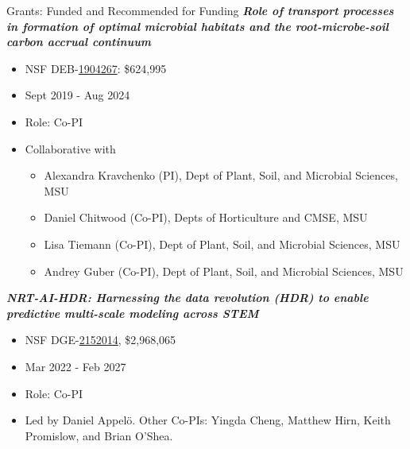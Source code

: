 \documentclass{resume} %
\begin{document}
\begin{rSection}{Grants: Funded and Recommended for Funding}
\textbf{\textit{Role of transport processes in formation of optimal microbial habitats and the root-microbe-soil carbon accrual continuum}}
\vspace{-.1in}
\begin{itemize}{}{\leftmargin=0em}
   \itemsep -0.6em %
   \item
NSF DEB-\href{https://nsf.gov/awardsearch/showAward?AWD_ID=1904267}{1904267}: \$624,995
\item
Sept 2019 - Aug 2024
   \item
Role: Co-PI
\item Collaborative with
   \vspace{-.1in}
\begin{itemize}{}{\leftmargin=0em}
   \itemsep -0.6em %
  \item Alexandra Kravchenko (PI),  Dept of Plant, Soil, and Microbial Sciences, MSU
  \item Daniel Chitwood (Co-PI), Depts of Horticulture and CMSE, MSU
  \item Lisa Tiemann (Co-PI), Dept of Plant, Soil, and Microbial Sciences, MSU
  \item Andrey Guber (Co-PI), Dept of Plant, Soil, and Microbial Sciences, MSU
\end{itemize}
\end{itemize}

\textbf{\textit{NRT-AI-HDR: Harnessing the data revolution (HDR) to enable
predictive multi-scale modeling across STEM }}
\vspace{-.1in}
\begin{itemize}{}{\leftmargin=0em}
   \itemsep -0.6em %
   \item NSF DGE-\href{https://nsf.gov/awardsearch/showAward?AWD_ID=2152014}{2152014}, \$2,968,065
\item
Mar 2022 - Feb 2027
   \item
Role: Co-PI
\item Led by Daniel Appel\"o. Other Co-PIs: Yingda Cheng, Matthew Hirn, Keith Promislow, and Brian O'Shea.

\end{itemize}



\end{rSection}
\end{document}
